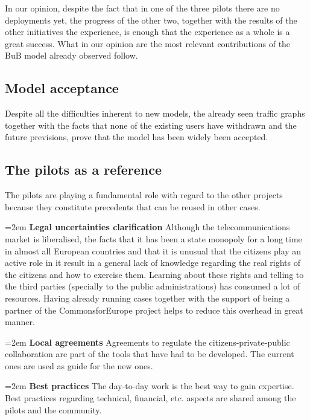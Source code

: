 In our opinion, despite the fact that in one of the three pilots there are no deployments yet, the progress of the other two, together with the results of the other initiatives the experience, is enough that the experience as a whole is a great success. What in our opinion are the most relevant contributions of the BuB model already observed follow.

\FloatBarrier
\subsection{Model acceptance}
\label{res_model}

Despite all the difficulties inherent to new models, the already seen traffic graphs together with the facts that none of the existing users have withdrawn and the future previsions, prove that the model has been widely been accepted.


\FloatBarrier
\subsection{The pilots as a reference}
\label{res_ref}

The pilots are playing a fundamental role with regard to the other projects because they constitute precedents that can be reused in other cases.

\hangindent=2em
\textbf{Legal uncertainties clarification}
Although the telecommunications market is liberalised, the facts that it has been a state monopoly for a long time in almost all European countries and that it is unusual that the citizens play an active role in it result in a general lack of knowledge regarding the real rights of the citizens and how to exercise them. Learning about these rights and telling to the third parties (specially to the public administrations) has consumed a lot of resources. Having already running cases together with the support of being a partner of the CommonsforEurope project helps to reduce this overhead in great manner.

\hangindent=2em
\textbf{Local agreements}
Agreements to regulate the citizens-private-public collaboration are part of the tools that have had to be developed. The current ones are used as guide for the new ones.

\hangindent=2em
\textbf{Best practices}
The day-to-day work is the best way to gain expertise. Best practices regarding technical, financial, etc. aspects are shared among the pilots and the community.


